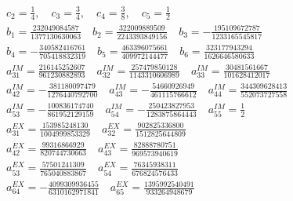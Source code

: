 \documentclass[final]{jpp}
\begin{document}
\begin{align*}
&c_2 = \frac{1}{4}, \quad c_3 = \frac{3}{4}, \quad c_4 = \frac{3}{8}, \quad c_5 = \frac{1}{2} \\ 
&b_1 = \frac{232 049 084 587}{1 377 130 630 063} \quad b_2 = \frac{322 009 889 509}{2 243 393 849 156} \quad b_3 = -\frac{195 109 672 787}{1 233 165 545 817} \\
&b_4 = -\frac{340 582 416 761}{705 418 832 319} \quad
b_5 = \frac{463 396 075 661}{409 972 144 477} \quad
b_6 = \frac{323 177 943 294}{1 626 646 580 633} \\
&a_{31}^{IM} = \frac{216 145 252 607}{961 230 882 893} \quad
a_{32}^{IM} = \frac{257 479 850 128}{1 143 310 606 989} \quad
a_{33}^{IM} = \frac{30 481 561 667}{101 628 412 017} \\
&a_{42}^{IM} = -\frac{381 180 097 479}{1 276 440 792 700} \quad
a_{43}^{IM} = - \frac{54 660 926 949}{461 115 766 612} \quad
a_{44}^{IM} = \frac{344 309 628 413}{552 073 727 558} \\
&a_{53}^{IM} = -\frac{100 836 174 740}{861 952 129 159} \quad
a_{54}^{IM} = -\frac{250 423 827 953}{1 283 875 864 443} \quad
a_{55}^{IM} = \frac{1}{2} \\
&a_{31}^{EX} = \frac{153 985 248 130}{1 004 999 853 329} \quad
a_{32}^{EX} = \frac{902 825 336 800}{1 512 825 644 809} \\
&a_{42}^{EX} = \frac{99 316 866 929}{820 744 730 663} \quad
a_{43}^{EX} = \frac{82 888 780 751}{969 573 940 619} \\
&a_{53}^{EX} = \frac{57 501 241 309}{765 040 883 867} \quad
a_{54}^{EX} = \frac{76 345 938 311}{676 824 576 433} \\
&a_{64}^{EX} = - \frac{4 099 309 936 455}{6 310 162 971 841} \quad
a_{65}^{EX} = \frac{1 395 992 540 491}{933 264 948 679}
\end{align*}

\newpage



\end{document}
